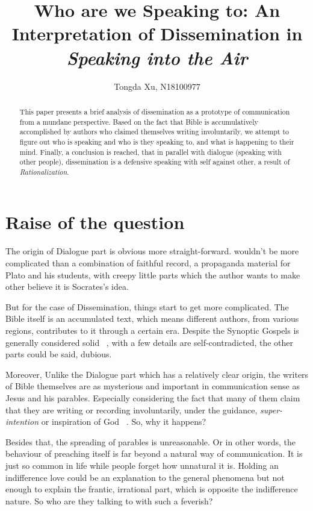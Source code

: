 \documentclass[]{article}
\title{Who are we Speaking to: An Interpretation of Dissemination in \textit{Speaking into the Air}}
\author{Tongda Xu, N18100977}
\begin{document}
\maketitle

\begin{abstract}
	
	This paper presents a brief analysis of dissemination as a prototype of communication from a mundane perspective. Based on the fact that Bible is accumulatively accomplished by authors who claimed themselves writing involuntarily, we attempt to figure out who is speaking and who is they speaking to, and what is happening to their mind. Finally, a conclusion is reached, that in parallel with dialogue (speaking with other people), dissemination is a defensive speaking with self against other, a result of \textit{Rationalization}.

\end{abstract}

\section{Raise of the question}

The origin of Dialogue part is obvious more straight-forward. wouldn't be more complicated than a combination of faithful record, a propaganda material for Plato and his students, with creepy little parts which the author wants to make other believe it is Socrates's idea.

But for the case of Dissemination, things start to get more complicated. The Bible itself is an accumulated text, which means different authors, from various regions, contributes to it through a certain era. Despite the Synoptic Gospels is generally considered solid ~\cite{derrenbacker2000history}, with a few details are self-contradicted, the other parts could be said, dubious. 

Moreover, Unlike the Dialogue part which has a relatively clear origin, the writers of Bible themselves are as mysterious and important in communication sense as Jesus and his parables. Especially considering the fact that many of them claim that they are writing or recording involuntarily, under the guidance, \textit{super-intention} or inspiration of God ~\cite{warfield1948inspiration}. So, why it happens? 

Besides that, the spreading of parables is unreasonable. Or in other words, the behaviour of preaching itself is far beyond a natural way of communication. It is just so common in life while people forget how unnatural it is. Holding an indifference love could be an explanation to the general phenomena but not enough to explain the frantic, irrational part, which is opposite the indifference nature. So who are they talking to with such a feverish?
\end{document}
